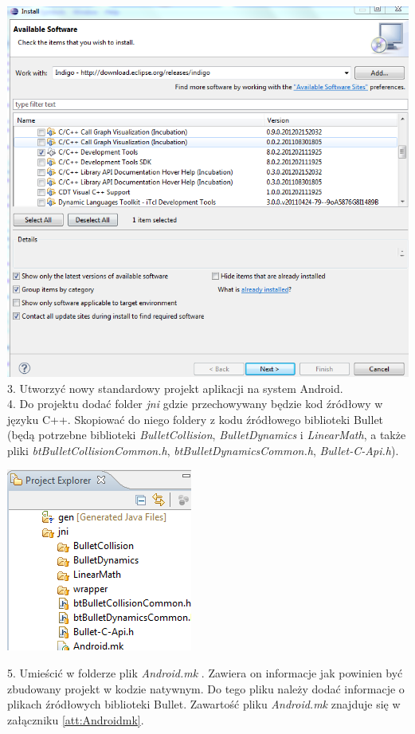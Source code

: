 \includegraphics[width=\textwidth]{./img/CDT.png}
3. Utworzyć nowy standardowy projekt aplikacji na system Android.\\
4. Do projektu dodać folder \emph{jni} gdzie przechowywany będzie kod źródłowy
w języku C++. Skopiować do niego foldery z kodu źródłowego biblioteki
Bullet (będą potrzebne biblioteki \emph{BulletCollision},
\emph{BulletDynamics} i \emph{LinearMath}, a także pliki \emph{btBulletCollisionCommon.h},
\emph{btBulletDynamicsCommon.h}, \emph{Bullet-C-Api.h}).
  
\begin{center}
\includegraphics{./img/bulletFoldery.png}
\end{center}
  
5. Umieścić w folderze plik \emph{Android.mk} . Zawiera on informacje jak
powinien być zbudowany projekt w kodzie natywnym. Do tego pliku należy
dodać informacje o plikach źródłowych biblioteki Bullet. Zawartość pliku
\emph{Android.mk} znajduje się w załączniku \ref{att:Androidmk}.
  
